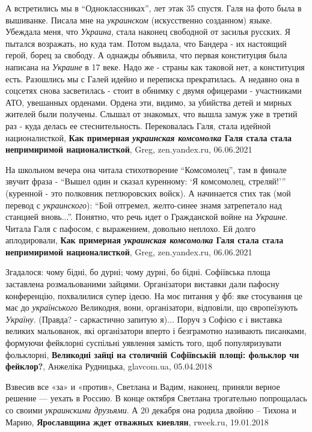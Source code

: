 А встретились мы в \enquote{Одноклассниках}, лет этак 35 спустя. Галя на фото была в
вышиванке. Писала мне на \emph{украинском} (искусственно созданном) языке. Убеждала
меня, что \emph{Украина}, стала наконец свободной от засилья русских. Я пытался
возражать, но куда там. Потом выдала, что Бандера - их настоящий герой, борец
за свободу. А однажды объявила, что первая конституция была написана на \emph{Украине}
в 17 веке. Надо же - страны как таковой нет, а конституция есть. Разошлись мы с
Галей идейно и переписка прекратилась. А недавно она в соцсетях снова
засветилась - стоит в обнимку с двумя офицерами - участниками АТО, увешанных
орденами. Ордена эти, видимо, за убийства детей и мирных жителей были получены.
Слышал от знакомых, что вышла замуж уже в третий раз - куда делась ее
стеснительность. Перековалась Галя, стала идейной националисткой,
\textbf{Как примерная \emph{украинская комсомолка} Галя стала стала непримиримой националисткой},
Greg, zen.yandex.ru, 06.06.2021

На школьном вечера она читала стихотворение \enquote{Комсомолец}, там в финале
звучит фраза - \enquote{Вышел один и сказал куренному: \enquote{Я комсомолец,
стреляй!}} (куренной - это полковник петлюровских войск). А начинается стих так
(мой перевод с \emph{украинского}): \enquote{Бой отгремел, желто-синее знамя
затрепетало над станцией вновь...}. Понятно, что речь идет о Гражданской войне
на \emph{Украине}. Читала Галя с пафосом, с выражением, довольно неплохо. Ей долго
аплодировали,
\textbf{Как примерная \emph{украинская комсомолка} Галя стала стала непримиримой националисткой},
Greg, zen.yandex.ru, 06.06.2021

Згадалося: чому бідні, бо дурні; чому дурні, бо бідні. Софіївська площа
заставлена розмальованими зайцями. Організатори виставки дали пафосну
конференцію, похвалилися супер ідеєю. На моє питання у фб: яке стосування це
має до \emph{українського} Великодня, вони, організатори, відповіли, що
європеїзують \emph{Україну}. (Правда? - саркастично запитую я)...  Поруч з
Софією є і виставка великих мальованок, які організатори вперто і безграмотно
називають писанками, формуючи фейклорні суспільні уявлення замість того, щоб
популяризувати фольклорні, 
\textbf{Великодні зайці на столичній Софіївській площі: фольклор чи фейклор?},
Анжеліка Рудницька, glavcom.ua, 05.04.2018

Взвесив все «за» и «против», Светлана и Вадим, наконец, приняли верное решение
— уехать в Россию. В конце октября Светлана трогательно попрощалась со своими
\emph{украинскими друзьями}. А 20 декабря она родила двойню – Тихона и Марию,
\textbf{Ярославщина ждет отважных киевлян}, rweek.ru, 19.01.2018

